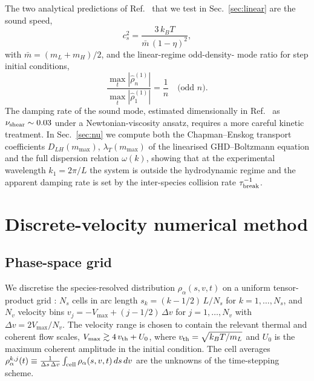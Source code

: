 \documentclass[aps,pre,twocolumn,superscriptaddress,longbibliography,floatfix]{revtex4-2}
\begin{document}
The two analytical predictions of Ref.~\cite{PaperIV} that we
test in Sec.~\ref{sec:linear} are the sound speed,
\begin{equation}
c_s^2 = \frac{3\,k_BT}{\bar m\,(1-\eta)^2},
\label{eq:cs}
\end{equation}
with $\bar m = (m_L+m_H)/2$, and the linear-regime odd-density-
mode ratio for step initial conditions,
\begin{equation}
\frac{\max_t|\hat\rho_n^{(1)}|}{\max_t|\hat\rho_1^{(1)}|}
= \frac{1}{n}\quad\text{(odd $n$)}.
\label{eq:ratio}
\end{equation}
The damping rate of the sound mode, estimated dimensionally
in Ref.~\cite{PaperIV} as $\nu_{\rm shear}\sim 0.03$ under a
Newtonian-viscosity ansatz, requires a more careful kinetic
treatment. In Sec.~\ref{sec:nu} we compute both the
Chapman--Enskog transport coefficients $D_{LH}(m_{\max})$,
$\lambda_T(m_{\max})$ of the linearised GHD--Boltzmann
equation and the full dispersion relation $\omega(k)$,
showing that at the experimental wavelength
$k_1=2\pi/L$ the system is outside the hydrodynamic regime
and the apparent damping rate is set by the inter-species
collision rate $\tau_{\rm break}^{-1}$.

\section{Discrete-velocity numerical method}\label{sec:dvm}

\subsection{Phase-space grid}

We discretise the species-resolved distribution
$\rho_\alpha(s,v,t)$ on a uniform tensor-product grid
\cite{Mieussens2000}:
$N_s$ cells in arc length $s_k = (k-1/2)\,L/N_s$ for
$k=1,\dots,N_s$, and $N_v$ velocity bins
$v_j = -V_{\max} + (j-1/2)\,\Delta v$ for $j=1,\dots,N_v$ with
$\Delta v = 2 V_{\max}/N_v$. The velocity range is chosen to
contain the relevant thermal and coherent flow scales,
$V_{\max}\gtrsim 4\,v_{\rm th}+U_0$, where $v_{\rm th}=
\sqrt{k_BT/m_L}$ and $U_0$ is the maximum coherent amplitude in
the initial condition. The cell averages
$\rho_\alpha^{k,j}(t)\equiv\frac{1}{\Delta s\,\Delta v}\int_{\rm cell}
\rho_\alpha(s,v,t)\,ds\,dv$ are the unknowns of the
time-stepping scheme.
\end{document}
